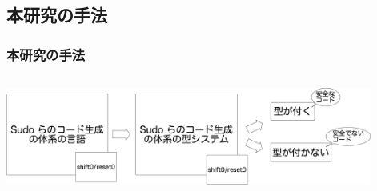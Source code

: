 \documentclass[dvipdfmx,cjk,xcolor=dvipsnames,envcountsect,notheorems,12pt]{beamer}
\theoremstyle{definition}
\begin{document}


\subsection{本研究の手法}
\begin{frame}
  \frametitle{本研究の手法}
  \begin{columns}
    \begin{column}{1.\textwidth}%
      \center
      \includegraphics[clip,height=3.2cm]{./img/code_s0r0.png}
    \end{column}
  \end{columns}
\end{frame}
\end{document}
